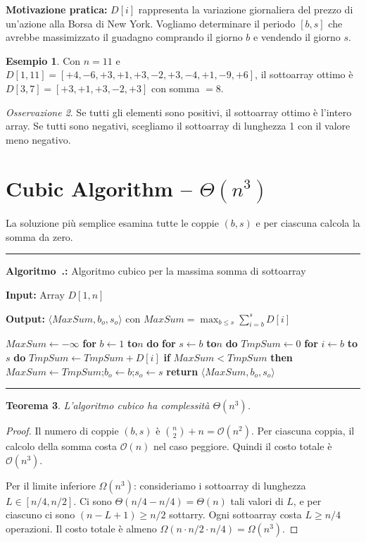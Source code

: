 \documentclass[12pt, a4paper, oneside]{book}
\newcounter{algocf}[chapter]
\renewcommand{\thealgocf}{\thechapter.\arabic{algocf}}
\newenvironment{algorithm}[1][H]{%
  \refstepcounter{algocf}%
  \par\medskip\noindent\rule{\linewidth}{0.4pt}\par\smallskip
}{%
  \par\smallskip\noindent\rule{\linewidth}{0.4pt}\par\medskip
}
\newcommand{\algcaption}[1]{\noindent\textbf{Algoritmo~\thealgocf:} #1\par\smallskip}
\newcommand{\KwIn}[1]{\noindent\textbf{Input:} #1\par}
\newcommand{\KwOut}[1]{\noindent\textbf{Output:} #1\par}
\newcommand{\For}[1]{\noindent\textbf{for} #1 \textbf{do}}
\newcommand{\If}[1]{\noindent\textbf{if} #1 \textbf{then}}
\newcommand{\Return}[1]{\noindent\textbf{return} #1}
\newcommand{\KwTo}{\textbf{to}}
\theoremstyle{plain}
\newtheorem{teorema}{Teorema}[chapter]
\theoremstyle{definition}
\newtheorem{esempio}[teorema]{Esempio}
\theoremstyle{remark}
\newtheorem{osservazione}[teorema]{Osservazione}
\newcommand{\OO}[1]{\mathcal{O}\!\left(#1\right)}
\newcommand{\Om}[1]{\Omega\!\left(#1\right)}
\newcommand{\Th}[1]{\Theta\!\left(#1\right)}
\begin{document}
\textbf{Motivazione pratica:} $D[i]$ rappresenta la variazione giornaliera del prezzo di un'azione alla Borsa di New York. Vogliamo determinare il periodo $[b, s]$ che avrebbe massimizzato il guadagno comprando il giorno $b$ e vendendo il giorno $s$.

\begin{esempio}
Con $n = 11$ e $D[1,11] = [+4, -6, +3, +1, +3, -2, +3, -4, +1, -9, +6]$, il sottoarray ottimo è $D[3,7] = [+3,+1,+3,-2,+3]$ con somma $= 8$.
\end{esempio}

\begin{osservazione}
Se tutti gli elementi sono positivi, il sottoarray ottimo è l'intero array. Se tutti sono negativi, scegliamo il sottoarray di lunghezza 1 con il valore meno negativo.
\end{osservazione}

\section{Cubic Algorithm -- $\Th{n^3}$}

La soluzione più semplice esamina tutte le coppie $(b, s)$ e per ciascuna calcola la somma da zero.

\begin{algorithm}[H]
\algcaption{Algoritmo cubico per la massima somma di sottoarray}
\KwIn{Array $D[1,n]$}
\KwOut{$\langle MaxSum, b_o, s_o \rangle$ con $MaxSum = \max_{b \le s} \sum_{i=b}^{s} D[i]$}
$MaxSum \leftarrow -\infty$\;
\For{$b \leftarrow 1$ \KwTo $n$}{
  \For{$s \leftarrow b$ \KwTo $n$}{
    $TmpSum \leftarrow 0$\;
    \For{$i \leftarrow b$ \KwTo $s$}{
      $TmpSum \leftarrow TmpSum + D[i]$\;
    }
    \If{$MaxSum < TmpSum$}{
      $MaxSum \leftarrow TmpSum$;\quad $b_o \leftarrow b$;\quad $s_o \leftarrow s$\;
    }
  }
}
\Return{$\langle MaxSum, b_o, s_o \rangle$}\;
\end{algorithm}

\begin{teorema}
L'algoritmo cubico ha complessità $\Th{n^3}$.
\end{teorema}
\begin{proof}
Il numero di coppie $(b,s)$ è $\binom{n}{2} + n = \OO{n^2}$. Per ciascuna coppia, il calcolo della somma costa $\OO{n}$ nel caso peggiore. Quindi il costo totale è $\OO{n^3}$.

Per il limite inferiore $\Om{n^3}$: consideriamo i sottoarray di lunghezza $L \in [n/4, n/2]$. Ci sono $\Th{n/4 - n/4} = \Th{n}$ tali valori di $L$, e per ciascuno ci sono $(n - L + 1) \ge n/2$ sottarry. Ogni sottoarray costa $L \ge n/4$ operazioni. Il costo totale è almeno $\Om{n \cdot n/2 \cdot n/4} = \Om{n^3}$.
\end{proof}
\end{document}
